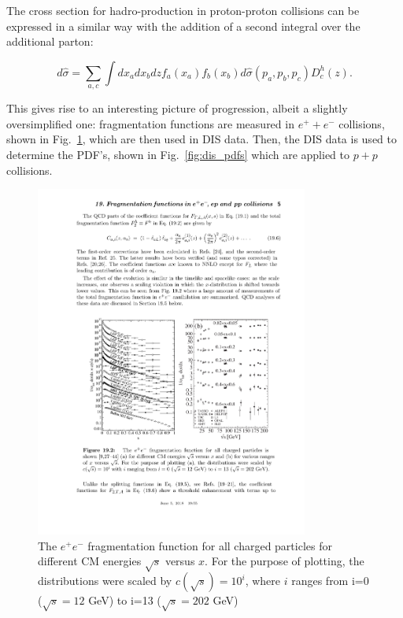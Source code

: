   The cross section for hadro-production in proton-proton collisions can be expressed in a similar way with the addition of a second integral over the additional parton:

  \begin{equation}
    d\hat{\sigma}= \sum_{a,c} \int dx_a dx_b dz f_a(x_a) f_b(x_b) d\hat{\sigma}(p_a,p_b,p_c) D_c^h(z).
    \label{p+p_sidis}
  \end{equation}

  This gives rise to an interesting picture of progression, albeit a slightly oversimplified one: fragmentation functions are measured in $e^+ + e^-$ collisions, shown in Fig.~\ref{fig:pdg_ff}, which are then used in DIS data. Then, the DIS data is used to determine the PDF's, shown in Fig.~\ref{fig:dis_pdfs} which are applied to $p+p$ collisions.

  \begin{figure}[htpb]
    \centering
    \includegraphics[width=0.8\textwidth]{Introduction/pdg_ff.pdf}
    \caption{The $e^+e^-$ fragmentation function for all charged particles for different CM energies  $ \sqrt{s} $ versus $x$. For the purpose of plotting, the distributions were scaled by  $c(\sqrt{s}) = 10^i$, where $i$ ranges from i=0 ($\sqrt{s}=12$ GeV) to i=13 ($\sqrt{s} = 202 $ GeV) \cite{deFlorian2018}} 
    \label{fig:pdg_ff}
  \end{figure}
  
